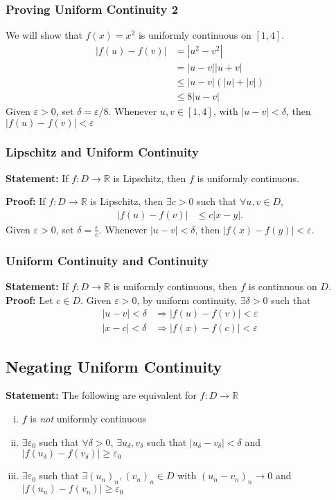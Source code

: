 \documentclass[10pt]{extarticle}
\newcommand{\R}{\mathbb{R}}
\begin{document}
    \subsubsection{Proving Uniform Continuity 2}%
    We will show that $f(x) = x^2$ is uniformly continuous on $[1,4]$.
    \begin{align*}
      |f(u) - f(v)| &= |u^2 - v^2|\\
                    &= |u-v||u+v|\\
                    &\leq |u-v|\left(|u| + |v|\right)\tag*{Triangle Inequality}\\
                    &\leq 8|u-v|
    \end{align*}
    Given $\varepsilon > 0$, set $\delta = \varepsilon/8$. Whenever $u,v\in [1,4]$, with $|u-v| < \delta$, then $|f(u)-f(v)| < \varepsilon$
    \subsubsection{Lipschitz and Uniform Continuity}%
    \textbf{Statement:} If $f: D\rightarrow \R$ is Lipschitz, then $f$ is uniformly continuous.

    \textbf{Proof:} If $f: D\rightarrow \R$ is Lipschitz, then $\exists c > 0$ such that $\forall u,v\in D$,
    \begin{align*}
      |f(u) - f(v)| &\leq c|x-y|.
    \end{align*}
    Given $\varepsilon > 0$, set $\delta = \frac{\varepsilon}{c}$. Whenever $|u-v| < \delta$, then $|f(x) - f(y)| < \varepsilon$.
    \subsubsection{Uniform Continuity and Continuity}%
    \textbf{Statement:} If $f: D\rightarrow \R$ is uniformly continuous, then $f$ is continuous on $D$.\\

    \textbf{Proof:} Let $c\in D$. Given $\varepsilon > 0$, by uniform continuity, $\exists \delta > 0$ such that 
    \begin{align*}
      |u-v| < \delta &\Rightarrow |f(u)-f(v)| < \varepsilon\\
      |x-c| < \delta &\Rightarrow |f(x)-f(c)| < \varepsilon
    \end{align*}
  \subsection{Negating Uniform Continuity}%
    \textbf{Statement:} The following are equivalent for $f: D\rightarrow \R$
    \begin{enumerate}[(i)]
      \item $f$ is \textit{not} uniformly continuous
      \item $\exists \varepsilon_0$ such that $\forall \delta > 0$, $\exists u_{\delta},v_{\delta}$ such that $|u_{\delta}-v_{\delta}| < \delta$ and $|f(u_{\delta}) - f(v_{\delta})| \geq \varepsilon_{0}$
      \item $\exists \varepsilon_0$ such that $\exists (u_n)_n,(v_n)_n\in D$ with $\left(u_n - v_n\right)_n \rightarrow 0$ and $|f(u_n) - f(v_n)| \geq \varepsilon_0$
    \end{enumerate}
\end{document}

